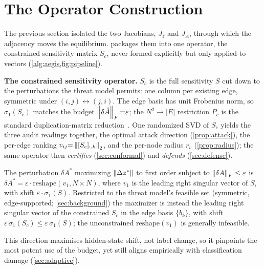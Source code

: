 \section{The \AEGIS Operator Construction}
\label{sec:framework}

The previous section isolated the two Jacobians, $J_z$ and $J_A$, through which the adjacency moves the equilibrium. \AEGIS packages them into one operator, the constrained sensitivity matrix $S_c$, never formed explicitly but only applied to vectors (\cref{alg:aegis,fig:pipeline}).

\textbf{The constrained sensitivity operator.} $S_c$ is the full sensitivity $S$ cut down to the perturbations the threat model permits: one column per existing edge, symmetric under $(i,j)\!\leftrightarrow\!(j,i)$. The edge basis has unit Frobenius norm, so $\sigma_1(S_c)$ matches the budget $\left\|\delta\hat{A}\right\|_F{=}\varepsilon$; the $N^2 \to |E|$ restriction $P_c$ is the standard duplication-matrix reduction~\cite{magnus2019matrix}. One randomized SVD of $S_c$ yields the three audit readings together, the optimal attack direction (\cref{prop:attack}), the per-edge ranking $v_{ij}{=}\left\|[S_c]_{:,k}\right\|_2$, and the per-node radius $r_v$ (\cref{prop:radius}); the same operator then \emph{certifies} (\cref{sec:conformal}) and \emph{defends} (\cref{sec:defense}).

\begin{proposition}
\label{prop:attack}
The perturbation $\delta A^*$ maximizing $\left\|\Delta z^{*}\right\|$ to first order subject to $\left\|\delta A\right\|_F \leq \varepsilon$ is $\delta A^* = \varepsilon \cdot \mathrm{reshape}(v_1, N \times N)$, where $v_1$ is the leading right singular vector of $S$, with shift $\varepsilon \cdot \sigma_1(S)$. Restricted to the threat model's feasible set (symmetric, edge-supported; \cref{sec:background}) the maximizer is instead the leading right singular vector of the constrained $S_c$ in the edge basis $\{b_k\}$, with shift $\varepsilon\,\sigma_1(S_c){\leq}\varepsilon\,\sigma_1(S)$; the unconstrained $\mathrm{reshape}(v_1)$ is generally infeasible.
\end{proposition}

This direction maximises hidden-state shift, not label change, so it pinpoints the most potent use of the budget, yet still aligns empirically with classification damage (\cref{sec:adaptive}).

